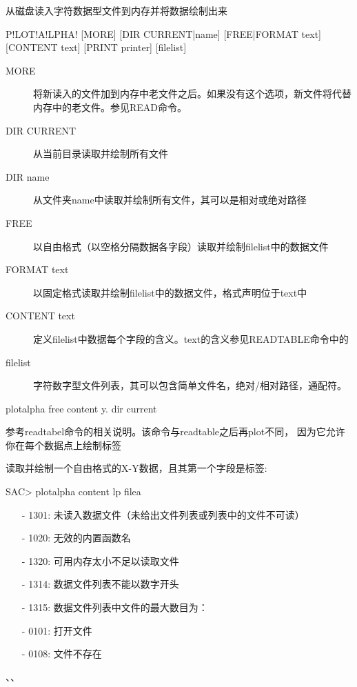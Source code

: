 \label{cmd:plotalpha}

从磁盘读入字符数据型文件到内存并将数据绘制出来

\begin{SACSTX}
P!LOT!A!LPHA! [MORE] [DIR CURRENT|name] [FREE|FORMAT text] [CONTENT text] 
    [PRINT printer] [filelist]
\end{SACSTX}

\begin{description}
\item [MORE] 将新读入的文件加到内存中老文件之后。如果没有这个选项，新文件将代替内存中的老文件。参见READ命令。
\item [DIR CURRENT] 从当前目录读取并绘制所有文件 
\item [DIR name] 从文件夹name中读取并绘制所有文件，其可以是相对或绝对路径 
\item [FREE] 以自由格式（以空格分隔数据各字段）读取并绘制filelist中的数据文件 
\item [FORMAT text] 以固定格式读取并绘制filelist中的数据文件，格式声明位于text中 
\item [CONTENT text] 定义filelist中数据每个字段的含义。text的含义参见READTABLE命令中的 
\item [filelist] 字符数字型文件列表，其可以包含简单文件名，绝对/相对路径，通配符。 
\end{description}

\begin{SACDFT}
plotalpha free content y. dir current
\end{SACDFT}

参考readtabel命令的相关说明。该命令与readtable之后再plot不同，
因为它允许你在每个数据点上绘制标签

读取并绘制一个自由格式的X-Y数据，且其第一个字段是标签:
\begin{SACCode}
SAC> plotalpha content lp filea
\end{SACCode}

\begin{itemize}
\item[-]1301: 未读入数据文件（未给出文件列表或列表中的文件不可读）
\item[-]1020: 无效的内置函数名
\item[-]1320: 可用内存太小不足以读取文件
\item[-]1314: 数据文件列表不能以数字开头
\item[-]1315: 数据文件列表中文件的最大数目为：
\end{itemize}

\begin{itemize}
\item[-]0101: 打开文件
\item[-]0108: 文件不存在
\end{itemize}

、、
